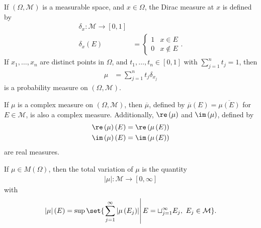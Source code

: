 \begin{definition}
  If $\left(\Omega,\mathcal{M}\right)$ is a measurable space, and $x\in \Omega$, the Dirac measure at $x$ is defined by
  \begin{align*}
    \delta_{x}\colon \mathcal{M}\rightarrow [0,1]\\
    \delta_x\left(E\right) &= \begin{cases}
      1 & x\in E\\
      0 & x\notin E
    \end{cases}.
  \end{align*}
    If $x_1,\dots,x_n$ are distinct points in $\Omega$, and $t_1,\dots,t_n\in [0,1]$ with $\sum_{j=1}^{n}t_j = 1$, then
    \begin{align*}
      \mu &= \sum_{j=1}^{n}t_j\delta_{x_j}
    \end{align*}
    is a probability measure on $\left(\Omega,\mathcal{M}\right)$.
\end{definition}
\begin{fact}
  If $\mu$ is a complex measure on $\left(\Omega,\mathcal{M}\right)$, then $\overline{\mu}$, defined by $\overline{\mu}\left(E\right) = \overline{\mu\left(E\right)}$ for $E\in \mathcal{M}$, is also a complex measure. Additionally, $\re\left(\mu\right)$ and $\im\left(\mu\right)$, defined by
  \begin{align*}
    \re\left(\mu\right)\left(E\right) &= \re\left(\mu\left(E\right)\right)\\
    \im\left(\mu\right)\left(E\right) &= \im\left(\mu\left(E\right)\right)
  \end{align*}
  are real measures.
\end{fact}
\begin{definition}
  If $\mu\in M\left(\Omega\right)$, then the total variation of $\mu$ is the quantity
  \begin{align*}
    \left\vert \mu \right\vert\colon \mathcal{M}\rightarrow [0,\infty]
    \end{align*}
    with
    \begin{align*}
    \left\vert \mu \right\vert\left(E\right) = \sup\set{\left.\sum_{j=1}^{\infty}\left\vert \mu\left(E_j\right) \right\vert\right|E = \sqcup_{j=1}^{\infty}E_j,~E_j\in\mathcal{M}}.
  \end{align*}
\end{definition}
